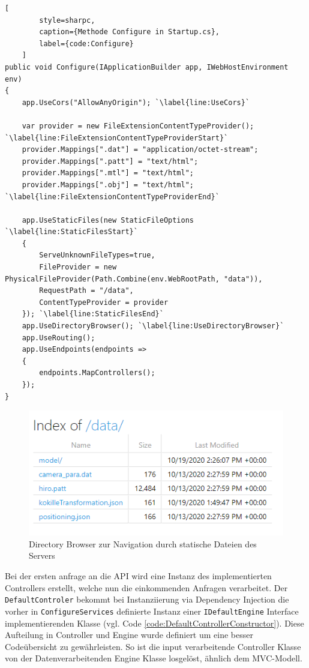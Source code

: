 \begin{codeblock}
	\begin{lstlisting}[
		style=sharpc,
		caption={Methode Configure in Startup.cs},
		label={code:Configure}
	]
public void Configure(IApplicationBuilder app, IWebHostEnvironment env)
{
	app.UseCors("AllowAnyOrigin"); `\label{line:UseCors}`

	var provider = new FileExtensionContentTypeProvider(); `\label{line:FileExtensionContentTypeProviderStart}`
	provider.Mappings[".dat"] = "application/octet-stream";
	provider.Mappings[".patt"] = "text/html";
	provider.Mappings[".mtl"] = "text/html";
	provider.Mappings[".obj"] = "text/html"; `\label{line:FileExtensionContentTypeProviderEnd}`

	app.UseStaticFiles(new StaticFileOptions `\label{line:StaticFilesStart}`
	{
		ServeUnknownFileTypes=true,
		FileProvider = new PhysicalFileProvider(Path.Combine(env.WebRootPath, "data")),
		RequestPath = "/data",
		ContentTypeProvider = provider
	}); `\label{line:StaticFilesEnd}`
	app.UseDirectoryBrowser(); `\label{line:UseDirectoryBrowser}`
	app.UseRouting();
	app.UseEndpoints(endpoints =>
	{
		endpoints.MapControllers();
	});
}
	\end{lstlisting}
\end{codeblock}

\begin{figure}
	\centering
	\includegraphics[width=0.7\linewidth]{images/backend/DirectoryBrowser}
	\caption{Directory Browser zur Navigation durch statische Dateien des Servers}
	\label{fig:DirectoryBrowser}
\end{figure}

Bei der ersten anfrage an die API wird eine Instanz des implementierten
Controllers erstellt, welche nun die einkommenden Anfragen verarbeitet.
Der \texttt{DefaultControler} bekommt bei Instanziierung via Dependency Injection
die vorher in \texttt{ConfigureServices} definierte Instanz einer \texttt{IDefaultEngine}
Interface implementierenden Klasse
(vgl. Code \ref{code:DefaultControllerConstructor}).
Diese Aufteilung in Controller und Engine wurde definiert um eine besser
Codeübersicht zu gewährleisten. So ist die input verarbeitende Controller
Klasse von der Datenverarbeitenden Engine Klasse losgelöst, ähnlich dem MVC-Modell.


